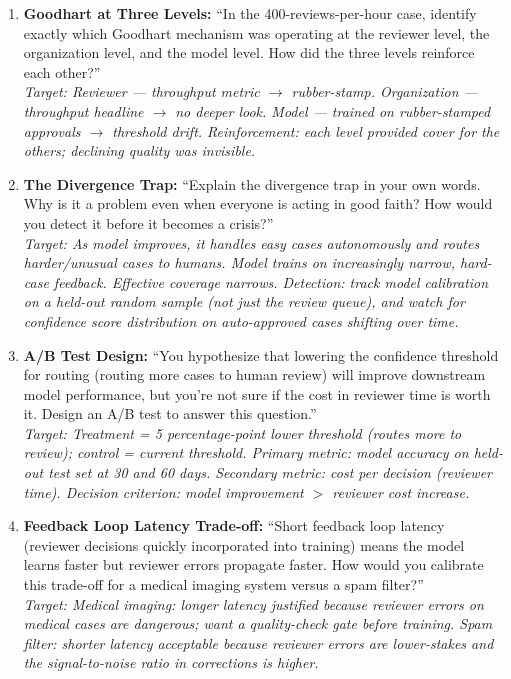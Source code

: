 \begin{enumerate}
    \item \textbf{Goodhart at Three Levels:} ``In the 400-reviews-per-hour case, identify exactly which Goodhart mechanism was operating at the reviewer level, the organization level, and the model level. How did the three levels reinforce each other?''\\
    \textit{Target: Reviewer --- throughput metric $\to$ rubber-stamp. Organization --- throughput headline $\to$ no deeper look. Model --- trained on rubber-stamped approvals $\to$ threshold drift. Reinforcement: each level provided cover for the others; declining quality was invisible.}

    \item \textbf{The Divergence Trap:} ``Explain the divergence trap in your own words. Why is it a problem even when everyone is acting in good faith? How would you detect it before it becomes a crisis?''\\
    \textit{Target: As model improves, it handles easy cases autonomously and routes harder/unusual cases to humans. Model trains on increasingly narrow, hard-case feedback. Effective coverage narrows. Detection: track model calibration on a held-out random sample (not just the review queue), and watch for confidence score distribution on auto-approved cases shifting over time.}

    \item \textbf{A/B Test Design:} ``You hypothesize that lowering the confidence threshold for routing (routing more cases to human review) will improve downstream model performance, but you're not sure if the cost in reviewer time is worth it. Design an A/B test to answer this question.''\\
    \textit{Target: Treatment = 5 percentage-point lower threshold (routes more to review); control = current threshold. Primary metric: model accuracy on held-out test set at 30 and 60 days. Secondary metric: cost per decision (reviewer time). Decision criterion: model improvement $>$ reviewer cost increase.}

    \item \textbf{Feedback Loop Latency Trade-off:} ``Short feedback loop latency (reviewer decisions quickly incorporated into training) means the model learns faster but reviewer errors propagate faster. How would you calibrate this trade-off for a medical imaging system versus a spam filter?''\\
    \textit{Target: Medical imaging: longer latency justified because reviewer errors on medical cases are dangerous; want a quality-check gate before training. Spam filter: shorter latency acceptable because reviewer errors are lower-stakes and the signal-to-noise ratio in corrections is higher.}
\end{enumerate}

